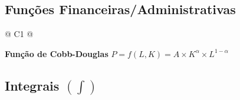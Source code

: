 	\subsection{Funções Financeiras/Administrativas}

		\begin{longtable}{
		@{}
		C{1\textwidth} 
		@{}}

			\toprule
			\textbf{Função de Cobb-Douglas}
			\tabularnewline
			\midrule
			{\large $P = f(L, K) = A \times K^{\alpha} \times L^{1 - \alpha}$}
			\tabularnewline
			\bottomrule

		\end{longtable}
		
	\subsection{Integrais $(\int)$}

